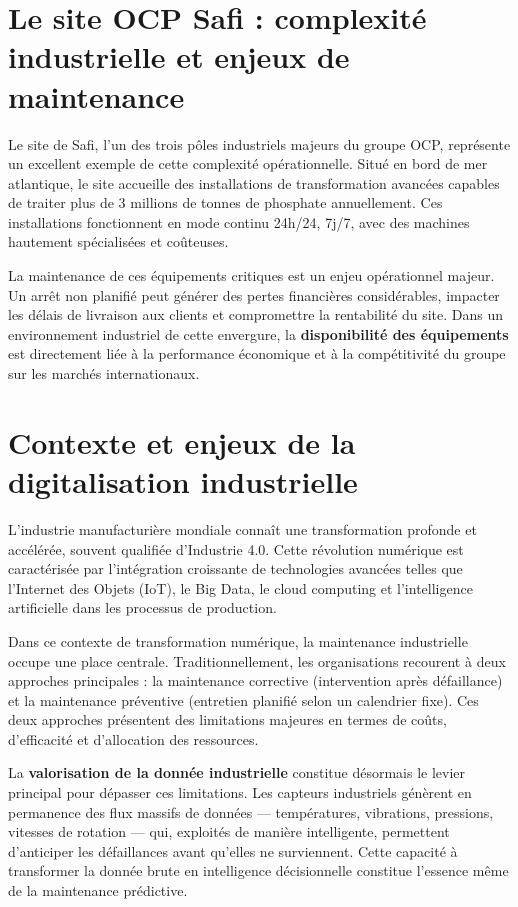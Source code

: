 \documentclass[a4paper,12pt]{report}
\begin{document}
\section*{Le site OCP Safi : complexité industrielle et enjeux de maintenance}

Le site de Safi, l'un des trois pôles industriels majeurs du groupe OCP, représente un excellent exemple de cette complexité opérationnelle. Situé en bord de mer atlantique, le site accueille des installations de transformation avancées capables de traiter plus de 3 millions de tonnes de phosphate annuellement. Ces installations fonctionnent en mode continu 24h/24, 7j/7, avec des machines hautement spécialisées et coûteuses.

La maintenance de ces équipements critiques est un enjeu opérationnel majeur. Un arrêt non planifié peut générer des pertes financières considérables, impacter les délais de livraison aux clients et compromettre la rentabilité du site. Dans un environnement industriel de cette envergure, la \textbf{disponibilité des équipements} est directement liée à la performance économique et à la compétitivité du groupe sur les marchés internationaux.

\section*{Contexte et enjeux de la digitalisation industrielle}

L'industrie manufacturière mondiale connaît une transformation profonde et accélérée, souvent qualifiée d'Industrie 4.0. Cette révolution numérique est caractérisée par l'intégration croissante de technologies avancées telles que l'Internet des Objets (IoT), le Big Data, le cloud computing et l'intelligence artificielle dans les processus de production.

Dans ce contexte de transformation numérique, la maintenance industrielle occupe une place centrale. Traditionnellement, les organisations recourent à deux approches principales : la maintenance corrective (intervention après défaillance) et la maintenance préventive (entretien planifié selon un calendrier fixe). Ces deux approches présentent des limitations majeures en termes de coûts, d'efficacité et d'allocation des ressources.

La \textbf{valorisation de la donnée industrielle} constitue désormais le levier principal pour dépasser ces limitations. Les capteurs industriels génèrent en permanence des flux massifs de données — températures, vibrations, pressions, vitesses de rotation — qui, exploités de manière intelligente, permettent d'anticiper les défaillances avant qu'elles ne surviennent. Cette capacité à transformer la donnée brute en intelligence décisionnelle constitue l'essence même de la maintenance prédictive.
\end{document}
